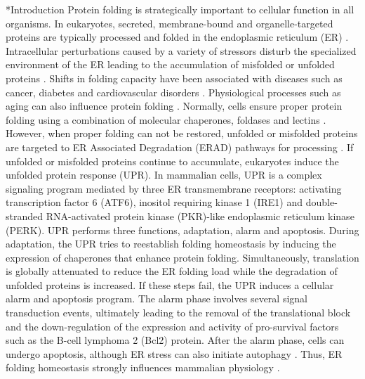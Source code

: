 \documentclass[12pt]{article}
\makeatletter
\renewcommand\section{\@startsection
	{subsection}{2}{0mm}
	{-0.2in}
	{0.05\baselineskip}
	{\normalfont\large\bfseries}}
\makeatother
\begin{document}
\pagebreak

\setcounter{page}{1}


\section*{Introduction}
Protein folding is strategically important to cellular function in all organisms. In eukaryotes, secreted, membrane-bound and organelle-targeted proteins are typically processed and folded in the endoplasmic reticulum (ER) \cite{naidoo2009er, ron2002translational, kaufman2002unfolded}. Intracellular perturbations caused by a variety of stressors disturb the specialized environment of the ER leading to the accumulation of misfolded or unfolded proteins \cite{ellgaard2003qce,Fonseca:2009fk}. Shifts in folding capacity have been associated with diseases such as cancer, diabetes and cardiovascular disorders \cite{ellgaard2003qce}. Physiological processes such as aging can also influence protein folding \cite{naidoo2009er}. Normally, cells ensure proper protein folding using a combination of molecular chaperones, foldases and lectins \cite{naidoo2009er}. However, when proper folding can not be restored, unfolded or misfolded proteins are targeted to ER Associated Degradation (ERAD) pathways for processing \cite{kaufman2002unfolded}. If unfolded or misfolded proteins continue to accumulate, eukaryotes induce the unfolded protein response (UPR). In mammalian cells, UPR is a complex signaling program mediated by three ER transmembrane receptors: activating transcription factor 6 (ATF6), inositol requiring kinase 1 (IRE1) and double-stranded RNA-activated protein kinase (PKR)-like endoplasmic reticulum kinase (PERK). UPR performs three functions, adaptation, alarm and apoptosis. During adaptation, the UPR tries to reestablish folding homeostasis by inducing the expression of chaperones that enhance protein folding. Simultaneously, translation is globally attenuated to reduce the ER folding load while the degradation of unfolded proteins is increased. If these steps fail, the UPR induces a cellular alarm and apoptosis program. The alarm phase involves several signal transduction events, ultimately leading to the removal of the translational block and the down-regulation of the expression and activity of pro-survival factors such as the B-cell lymphoma 2 (Bcl2) protein. After the alarm phase, cells can undergo apoptosis, although ER stress can also initiate autophagy \cite{ogata2006aac, yorimitsu2006ers, bernales2006ace, kamimoto2006iic, hoyerhansen2007cmc, kouroku2006esp, fujita2007ter}. Thus, ER folding homeostasis strongly influences mammalian physiology \cite{Fonseca:2009fk}.
\end{document}
